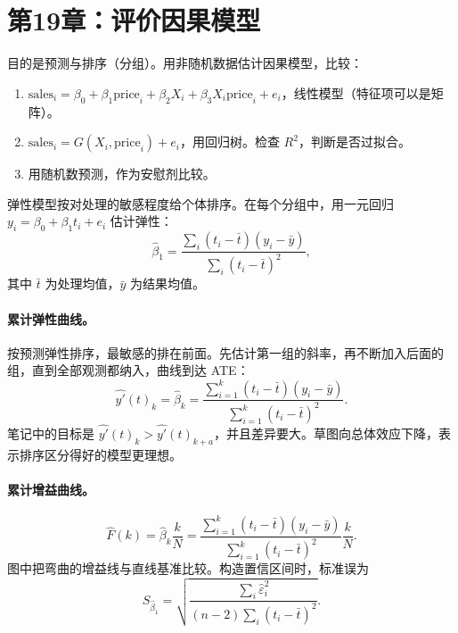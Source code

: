 {\section{第19章：评价因果模型}
目的是预测与排序（分组）。用非随机数据估计因果模型，比较：
\begin{enumerate}
\item $\mathrm{sales}_i=\beta_0+\beta_1\mathrm{price}_i+\beta_2X_i+\beta_3X_i\mathrm{price}_i+e_i$，线性模型（特征项可以是矩阵）。
\item $\mathrm{sales}_i=G(X_i,\mathrm{price}_i)+e_i$，用回归树。检查 $R^2$，判断是否过拟合。
\item 用随机数预测，作为安慰剂比较。
\end{enumerate}
弹性模型按对处理的敏感程度给个体排序。在每个分组中，用一元回归 $y_i=\beta_0+\beta_1t_i+e_i$ 估计弹性：
\[\hat\beta_1=\frac{\sum_i(t_i-\bar t)(y_i-\bar y)}{\sum_i(t_i-\bar t)^2},\]
其中 $\bar t$ 为处理均值，$\bar y$ 为结果均值。

\paragraph{累计弹性曲线。}
按预测弹性排序，最敏感的排在前面。先估计第一组的斜率，再不断加入后面的组，直到全部观测都纳入，曲线到达 ATE：
\[\widehat{y'}(t)_k=\hat\beta_k=
\frac{\sum_{i=1}^{k}(t_i-\bar t)(y_i-\bar y)}{\sum_{i=1}^{k}(t_i-\bar t)^2}.\]
笔记中的目标是 $\widehat{y'}(t)_k>\widehat{y'}(t)_{k+a}$，并且差异要大。草图向总体效应下降，表示排序区分得好的模型更理想。

\paragraph{累计增益曲线。}
\[\widehat F(k)=\hat\beta_k\frac{k}{N}
=\frac{\sum_{i=1}^{k}(t_i-\bar t)(y_i-\bar y)}{\sum_{i=1}^{k}(t_i-\bar t)^2}\frac{k}{N}.\]
图中把弯曲的增益线与直线基准比较。构造置信区间时，标准误为
\[S_{\hat\beta_1}=\sqrt{\frac{\sum_i\hat\varepsilon_i^2}{(n-2)\sum_i(t_i-\bar t)^2}}.\]

\begin{center}
\end{center}}
